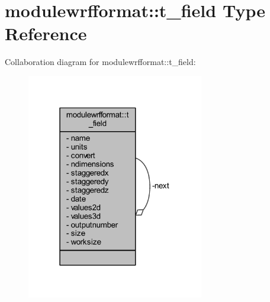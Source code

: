\hypertarget{structmodulewrfformat_1_1t__field}{}\section{modulewrfformat\+:\+:t\+\_\+field Type Reference}
\label{structmodulewrfformat_1_1t__field}


Collaboration diagram for modulewrfformat\+:\+:t\+\_\+field\+:\nopagebreak
\begin{figure}[H]
\begin{center}
\leavevmode
\includegraphics[width=219pt]{structmodulewrfformat_1_1t__field__coll__graph}
\end{center}
\end{figure}
